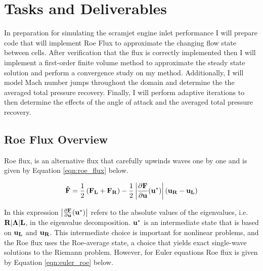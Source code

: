 \pagebreak
\section{Tasks and Deliverables}
In preparation for simulating the scramjet engine inlet performance I will prepare code that will implement Roe Flux to approximate the changing flow state between cells. After verification that the flux is correctly implemented then I will implement a first-order finite volume method to approximate the steady state solution and perform a convergence study on my method. Additionally, I will model Mach number jumps throughout the domain and determine the the averaged total pressure recovery. Finally, I will perform adaptive iterations to then determine the effects of the angle of attack and the averaged total pressure recovery.

\subsection{Roe Flux Overview}

Roe flux, is an alternative flux that carefully upwinds waves one by one and is given by Equation \ref{eqn:roe_flux} below. \cite{notes:kfid}

\vspace{-0.25in}
\begin{equation}\label{eqn:roe_flux}
    {\bf \hat{F}} = \frac{1}{2}\left({\bf F_L + F_R}\right) - \frac{1}{2} \left\lvert \frac{\partial {\bf F}}{\partial {\bf u}}({\bf u}^*)\right\lvert({\bf u_R - u_L})
\end{equation}

\vspace{-0.25in}
In this expression $\left\lvert \frac{\partial {\bf F}}{\partial {\bf u}}({\bf u}^*)\right\lvert$ refers to the absolute values of the eigenvalues, i.e. $\bf R|\Lambda | L$, in the eigenvalue decomposition. $\bf u^*$ is an intermediate state that is based on $\bf u_L$ and $\bf u_R$. This intermediate choice is important for nonlinear problems, and the Roe flux uses the Roe-average state, a choice that yields exact single-wave solutions to the Riemann problem. However, for Euler equations Roe flux is given by Equation \ref{eqn:euler_roe} below.

